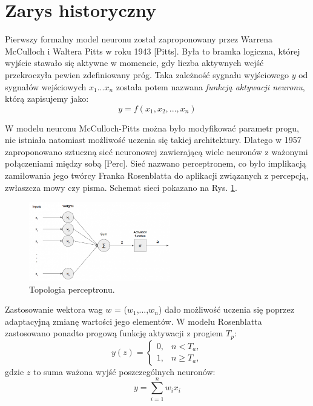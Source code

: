\section{Zarys historyczny}

Pierwszy formalny model neuronu został zaproponowany przez Warrena McCulloch i Waltera Pitts w roku 1943 [Pitts]. Była to bramka logiczna, której wyjście stawało się aktywne w momencie, gdy liczba aktywnych wejść przekroczyła pewien zdefiniowany próg. Taka zależność sygnału wyjściowego $y$ od sygnałów wejściowych $x_1$...$x_n$ została potem nazwana \textit{funkcją aktywacji neuronu}, którą zapisujemy jako:
\begin{equation}
\label{eqActFunc}
y=f\left(x_1, x_2,..., x_n\right)
\end{equation}

W modelu neuronu McCulloch-Pitts można było modyfikować parametr progu, nie istniała natomiast możliwość uczenia się takiej architektury. Dlatego w 1957 zaproponowano sztuczną sieć neuronowej zawierającą wiele neuronów z ważonymi połączeniami między sobą [Perc]. Sieć nazwano perceptronem, co było implikacją zamiłowania jego twórcy Franka Rosenblatta do aplikacji związanych z percepcją, zwłaszcza mowy czy pisma. Schemat sieci pokazano na Rys. \ref{Perceptron}.
\begin{figure}[h!]
	\centering
	\includegraphics[width=0.55\textwidth]{figures/perceptron.png}
	\caption{Topologia perceptronu.}
	\label{Perceptron}
\end{figure}

Zastosowanie wektora wag $w$ = ($w_1$,...,$w_n$) dało możliwość uczenia się poprzez adaptacyjną zmianę wartości jego elementów. W modelu Rosenblatta zastosowano ponadto progową funkcję aktywacji z progiem $T_p$:
\begin{equation}
y(z)=\begin{cases} 0, & n < T_a, \\ 1, & n \ge T_a, \end{cases}
\end{equation}
gdzie $z$ to suma ważona wyjść poszczególnych neuronów:
\begin{equation}
\label{eqLinActFunc}
y=\sum_{i=1}^{n}w_i x_i
\end{equation}

